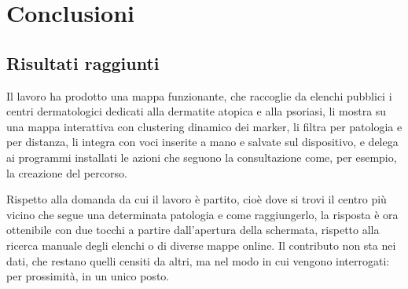 \chapter{Conclusioni}\label{ch:conclusioni}

\section{Risultati raggiunti}\label{sec:risultati-raggiunti}

Il lavoro ha prodotto una mappa funzionante, che raccoglie da elenchi pubblici i centri dermatologici dedicati
alla dermatite atopica e alla psoriasi, li mostra su una mappa interattiva con clustering dinamico dei marker, li filtra per
patologia e per distanza, %
li integra con voci inserite a mano e salvate sul dispositivo, e
delega ai programmi installati le azioni che seguono la consultazione come, per esempio, la creazione del percorso.

Rispetto alla domanda da cui il lavoro è partito, cioè dove si trovi il centro più vicino che segue una determinata patologia e
come raggiungerlo, la risposta è ora ottenibile con due tocchi a partire dall'apertura della schermata, rispetto alla ricerca manuale
degli elenchi o di diverse mappe online.
Il contributo non sta nei dati, che restano quelli censiti da altri, ma nel modo in cui vengono interrogati: per prossimità,
in un unico posto.

